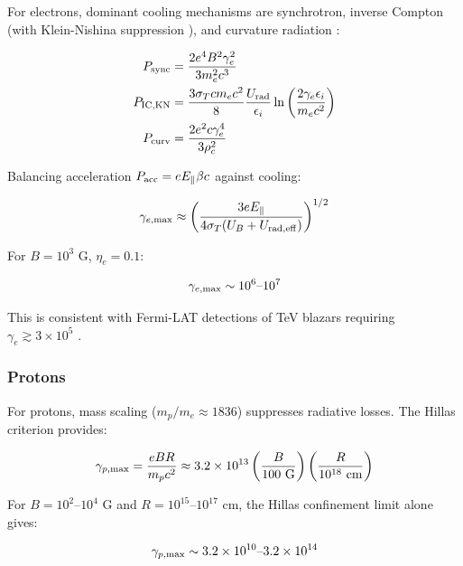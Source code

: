 \documentclass[twocolumn,superscriptaddress,prd,nofootinbib]{revtex4-2}
\begin{document}
For electrons, dominant cooling mechanisms are synchrotron, inverse Compton (with Klein-Nishina suppression \citep{Moderski2005,BlumenthalGould1970}), and curvature radiation \citep{Jackson1999}:

\begin{align}
P_{\rm sync} &= \frac{2e^4 B^2 \gamma_e^2}{3m_e^2 c^3} \label{eq:sync_cooling}\\
P_{\rm IC,KN} &= \frac{3\sigma_T c m_e c^2}{8} \frac{U_{\rm rad}}{\epsilon_i} \ln\left(\frac{2\gamma_e \epsilon_i}{m_e c^2}\right) \label{eq:IC_KN_cooling}\\
P_{\rm curv} &= \frac{2e^2 c \gamma_e^4}{3\rho_c^2} \label{eq:curvature}
\end{align}

Balancing acceleration $P_{\rm acc} = e E_\parallel \beta c$ against cooling:

\begin{equation}
\gamma_{e,\rm max} \approx \left( \frac{3 e E_\parallel}{4\sigma_T (U_B + U_{\rm rad,eff})} \right)^{1/2}
\label{eq:gamma_e_max}
\end{equation}

For $B = 10^3$ G, $\eta_e = 0.1$:

\begin{equation}
\gamma_{e,\rm max} \sim 10^6\text{--}10^7
\label{eq:gamma_e_result}
\end{equation}

This is consistent with Fermi-LAT detections of TeV blazars requiring $\gamma_e \gtrsim 3 \times 10^5$ \citep{Ajello2017}.

\subsubsection{Protons}

For protons, mass scaling ($m_p/m_e \approx 1836$) suppresses radiative losses. The Hillas criterion \citep{Hillas1984} provides:

\begin{equation}
\gamma_{p,\rm max} = \frac{eBR}{m_p c^2} \approx 3.2\times10^{13} \left(\frac{B}{100 \text{ G}}\right) \left(\frac{R}{10^{18} \text{ cm}}\right)
\label{eq:Hillas}
\end{equation}

For $B = 10^2$--$10^4$ G and $R = 10^{15}$--$10^{17}$ cm, the Hillas confinement limit alone gives:

\begin{equation}
\gamma_{p,\rm max} \sim 3.2\times10^{10}\text{--}3.2\times10^{14}
\label{eq:gamma_p_result}
\end{equation}
\end{document}
